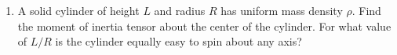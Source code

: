 \documentclass[fleqn]{article}
\begin{document}
\begin{enumerate}
      \textcolor{hwColor}{
        $
          F_{cor}=-2 \left(10 ^{-6} ~ kg\right) \left(314.16 ~ rad/s \hat{y} \times 10^{-1} ~ m \hat{x}\right)
          \\
          \\
          \therefore ~~~~~ F_{cor}=6.28 \times 10^{-6} ~ N (-\hat{z})
          \\
          \\
          \rule{15cm}{1pt}
          \\
          \\
          F_{cen}=- \left(10^{-6} ~ kg\right) \left(314.16 ~ rad/s \hat{y}\right) \left[314.16 ~ rad/s \hat{y} \times \left(3.3 \times 10^{-2} ~ m \hat{z}\right)\right]
          \\
          \\
          \therefore ~~~~~ F_{cen}=3.26 \times 10^{-3} N \hat{z}
          \\
          \\
          \rule{15cm}{1pt}
          \\
          \\
          F_{eul}=-\left(10^{-6} ~ kg\right) \left(-62.8 ~ rad/s \hat{y} \right) \left(3300 ~ m \hat{z}\right)
          \\
          \\
          \therefore ~~~~~ F_{eul}=2.07 \times 10^{-6} ~ N \hat{x}
        $
      }

    \item A solid cylinder of height $L$ and radius $R$ has uniform mass density $\rho$. Find the moment of inertia tensor about the center of the cylinder. For
    what value of $L/R$ is the cylinder equally easy to spin about any axis?


\end{enumerate}
\end{document}
